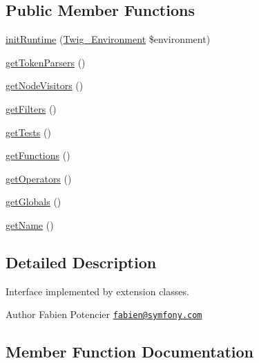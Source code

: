 \subsection*{Public Member Functions}
\begin{DoxyCompactItemize}
\item 
\hyperlink{interface_twig___extension_interface_ab17a2e5ce3e5789febe1f3a96e61ec38}{init\+Runtime} (\hyperlink{class_twig___environment}{Twig\+\_\+\+Environment} \$environment)
\item 
\hyperlink{interface_twig___extension_interface_a8fd35903c3d01c0f0078f59d142eb063}{get\+Token\+Parsers} ()
\item 
\hyperlink{interface_twig___extension_interface_aec02093179d390d22ae4083f23a1d74a}{get\+Node\+Visitors} ()
\item 
\hyperlink{interface_twig___extension_interface_a428d91319fc73d3038784cf5436936b6}{get\+Filters} ()
\item 
\hyperlink{interface_twig___extension_interface_a7e247dd31cc8d37a6c97353a062a0080}{get\+Tests} ()
\item 
\hyperlink{interface_twig___extension_interface_a131c2522f07821f77cd1d038c216031b}{get\+Functions} ()
\item 
\hyperlink{interface_twig___extension_interface_aeaf58da661970280d00b67c17dc4f8d4}{get\+Operators} ()
\item 
\hyperlink{interface_twig___extension_interface_ae3a26252ce6efe503698085a7ed69dad}{get\+Globals} ()
\item 
\hyperlink{interface_twig___extension_interface_a3d0963e68bb313b163a73f2803c64600}{get\+Name} ()
\end{DoxyCompactItemize}


\subsection{Detailed Description}
Interface implemented by extension classes.

\begin{DoxyAuthor}{Author}
Fabien Potencier \href{mailto:fabien@symfony.com}{\tt fabien@symfony.\+com} 
\end{DoxyAuthor}


\subsection{Member Function Documentation}
\hypertarget{interface_twig___extension_interface_a428d91319fc73d3038784cf5436936b6}{}
